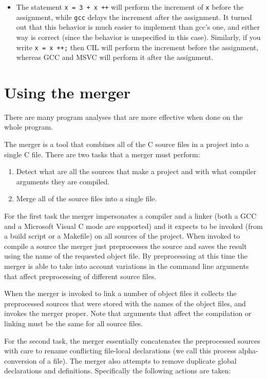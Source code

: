 \documentclass{article}
\def\t#1{{\tt #1}}
\begin{document}
\begin{itemize}
\item The statement \t{x = 3 + x ++} will perform the increment of \t{x}
  before the assignment, while \t{gcc} delays the increment after the
  assignment. It turned out that this behavior is much easier to implement
  than gcc's one, and either way is correct (since the behavior is unspecified
  in this case). Similarly, if you write \t{x = x ++;} then CIL will perform
  the increment before the assignment, whereas GCC and MSVC will perform it
  after the assignment. 
\end{itemize}

  \section{Using the merger}\label{sec-merger}

 There are many program analyses that are more effective when
done on the whole program.

 The merger is a tool that combines all of the C source files in a project
into a single C file. There are two tasks that a merger must perform:
\begin{enumerate}
\item Detect what are all the sources that make a project and with what
compiler arguments they are compiled.

\item Merge all of the source files into a single file. 
\end{enumerate}

 For the first task the merger impersonates a compiler and a linker (both a
GCC and a Microsoft Visual C mode are supported) and it expects to be invoked
(from a build script or a Makefile) on all sources of the project. When
invoked to compile a source the merger just preprocesses the source and saves
the result using the name of the requested object file. By preprocessing at
this time the merger is able to take into account variations in the command
line arguments that affect preprocessing of different source files.

 When the merger is invoked to link a number of object files it collects the
preprocessed sources that were stored with the names of the object files, and
invokes the merger proper. Note that arguments that affect the compilation or
linking must be the same for all source files.

 For the second task, the merger essentially concatenates the preprocessed
sources with care to rename conflicting file-local declarations (we call this
process alpha-conversion of a file). The merger also attempts to remove
duplicate global declarations and definitions. Specifically the following
actions are taken: 
\end{document}
